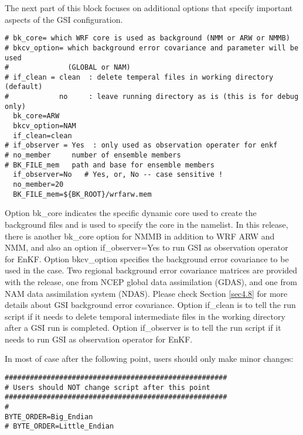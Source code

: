 The next part of this block focuses on additional options that specify important aspects of the GSI configuration. 

\begin{footnotesize}
\begin{verbatim}
# bk_core= which WRF core is used as background (NMM or ARW or NMMB)
# bkcv_option= which background error covariance and parameter will be used
#              (GLOBAL or NAM)
# if_clean = clean  : delete temperal files in working directory (default)
#            no     : leave running directory as is (this is for debug only)
  bk_core=ARW
  bkcv_option=NAM
  if_clean=clean
# if_observer = Yes  : only used as observation operater for enkf
# no_member     number of ensemble members
# BK_FILE_mem   path and base for ensemble members
  if_observer=No   # Yes, or, No -- case sensitive !
  no_member=20
  BK_FILE_mem=${BK_ROOT}/wrfarw.mem
\end{verbatim}
\end{footnotesize}

Option bk\_core indicates the specific dynamic core used to create the background files and is used to specify the core in the namelist. In this release, there is another bk\_core option for NMMB in addition to WRF ARW and NMM, and also an option if\_observer=Yes to run GSI as observation operator for EnKF. Option bkcv\_option specifies the background error covariance to be used in the case. Two regional background error covariance matrices are provided with the release, one from NCEP global data assimilation (GDAS), and one from NAM data assimilation system (NDAS). Please check Section \ref{sec4.8} for more details about GSI background error covariance. Option if\_clean is to tell the run script if it needs to delete temporal intermediate files in the working directory after a GSI run is completed. Option if\_observer is to tell the run script if it needs to run GSI as observation operator for EnKF.

In most of case after the following point, users should only make minor changes: 

\begin{footnotesize}
\begin{verbatim}
#####################################################
# Users should NOT change script after this point
#####################################################
#
BYTE_ORDER=Big_Endian
# BYTE_ORDER=Little_Endian
\end{verbatim}
\end{footnotesize}


